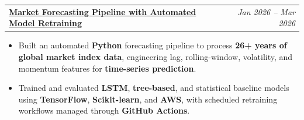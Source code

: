 \documentclass[10pt,letterpaper]{article}
\makeatletter
\newcommand{\projectheader}[2]{%
  \noindent
  \begin{tabularx}{\linewidth}{@{}X r@{}}
    \textbf{#1} & \textit{#2}
  \end{tabularx}\vspace{0pt}%
}
\newcommand{\entrysep}{\vspace{2pt}}
\makeatother
\begin{document}
\entrysep

\projectheader{\href{\detokenize{https://github.com/pranavsp108/stock-market-pipeline}}{{\fontsize{11pt}{13pt}\selectfont Market Forecasting Pipeline with Automated Model Retraining}}}{Jan 2026 -- Mar 2026}
\begin{itemize}
  \item Built an automated \textbf{Python} forecasting pipeline to process \textbf{26+ years of global market index data}, engineering lag, rolling-window, volatility, and momentum features for \textbf{time-series prediction}.
  \item Trained and evaluated \textbf{LSTM}, \textbf{tree-based}, and statistical baseline models using \textbf{TensorFlow}, \textbf{Scikit-learn}, and \textbf{AWS}, with scheduled retraining workflows managed through \textbf{GitHub Actions}.
\end{itemize}

\end{document}
